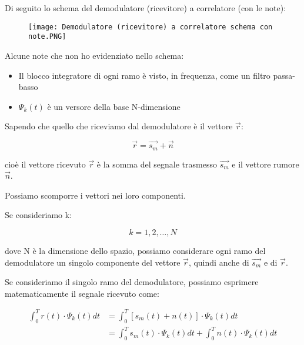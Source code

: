 Di seguito lo schema del demodulatore (ricevitore) a correlatore (con le note): 

\begin{figure}[h]
    \centering
    \texttt{[image: Demodulatore (ricevitore) a correlatore schema con note.PNG]}
\end{figure}

Alcune note che non ho evidenziato nello schema: 

\begin{itemize}
    \item Il blocco integratore di ogni ramo è visto, in frequenza, come un filtro passa-basso 
    \item $\Psi_k (t)$ è un versore della base N-dimensione 
\end{itemize}

Sapendo che quello che riceviamo dal demodulatore è il vettore $\overrightarrow{r}$: 

{
    \Large 
    \begin{equation}
        \overrightarrow{r} = \overrightarrow{s_m} + \overrightarrow{n}
    \end{equation}
}

cioè il vettore ricevuto $\overrightarrow{r}$ è la somma del segnale trasmesso $\overrightarrow{s_m} $ e il vettore rumore $\overrightarrow{n}$. \newline 

Possiamo scomporre i vettori nei loro componenti. \newline 

Se consideriamo k: 

{
    \Large 
    \begin{equation}
        k = 1, 2, \dots, N
    \end{equation}
}

dove N è la dimensione dello spazio, 
possiamo considerare ogni ramo del demodulatore un singolo componente del vettore $\overrightarrow{r}$, 
quindi anche di $\overrightarrow{s_m}$ e di $\overrightarrow{r}$. \newline 

Se consideriamo il singolo ramo del demodulatore,  
possiamo esprimere matematicamente il segnale ricevuto come: 

{
    \Large 
    \begin{equation}
        \begin{split}
        \int_{0}^{T}
        r(t) \cdot \Psi_k (t) 
        dt 
        &=
        \int_{0}^{T}
        \left[
            s_m (t) + n(t)
        \right]
        \cdot 
        \Psi_k (t)
        dt
        \\
        &=
        \int_{0}^{T}
        s_m (t)
        \cdot 
        \Psi_k (t)
        dt
        + 
        \int_{0}^{T}
        n(t)
        \cdot 
        \Psi_k (t)
        dt
        \end{split}
    \end{equation}
}

